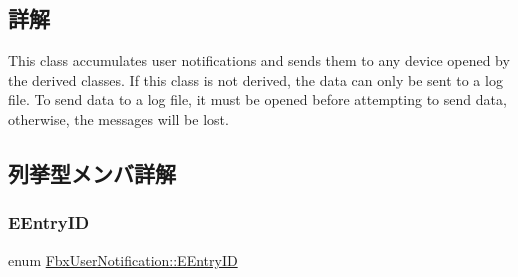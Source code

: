 \subsection{詳解}
This class accumulates user notifications and sends them to any device opened by the derived classes. If this class is not derived, the data can only be sent to a log file. To send data to a log file, it must be opened before attempting to send data, otherwise, the messages will be lost. 

\subsection{列挙型メンバ詳解}
\mbox{\label{class_fbx_user_notification_a88d8e70c3d6881a5bfe7531079ac6831}} 
\subsubsection{\texorpdfstring{E\+Entry\+ID}{EEntryID}}
{\footnotesize\ttfamily enum \hyperlink{class_fbx_user_notification_a88d8e70c3d6881a5bfe7531079ac6831}{Fbx\+User\+Notification\+::\+E\+Entry\+ID}}

